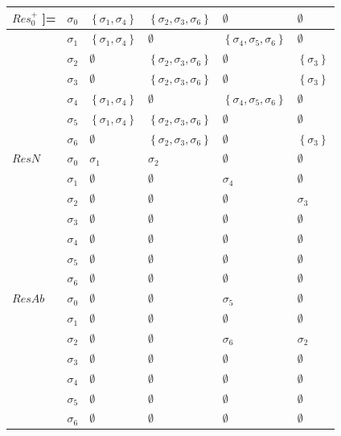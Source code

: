 \documentclass[11pt,a4paper]{article}
\begin{document}
\begin{table}[]
\begin{tabular}{|l|l|l|l|l|l|}
$Res_0^+$
]= & $\sigma_0$ & $\left\{\sigma_1, \sigma_4\right\}$  & $\left\{\sigma_2, \sigma_3,\sigma_6\right\}$ & $\emptyset$ & $\emptyset$   \\ \hline
     & $\sigma_1$ &  $\left\{\sigma_1, \sigma_4\right\}$  & $\emptyset$ & $\left\{\sigma_4, \sigma_5,\sigma_6\right\}$  &  $\emptyset$  \\ \hline
     & $\sigma_2$ &  $\emptyset$  & $\left\{\sigma_2, \sigma_3,\sigma_6\right\}$ & $\emptyset$   &  $\left\{\sigma_3\right\}$ \\ \hline
     & $\sigma_3$ &  $\emptyset$  & $\left\{\sigma_2, \sigma_3,\sigma_6\right\}$ & $\emptyset$   &  $\left\{\sigma_3\right\}$ \\ \hline
     & $\sigma_4$ &  $\left\{\sigma_1, \sigma_4\right\}$  & $\emptyset$ & $\left\{\sigma_4, \sigma_5,\sigma_6\right\}$   &  $\emptyset$  \\ \hline
     & $\sigma_5$ &  $\left\{\sigma_1, \sigma_4\right\}$  & $\left\{\sigma_2, \sigma_3,\sigma_6\right\}$ & $\emptyset$   &  $\emptyset$  \\ \hline
     & $\sigma_6$ &  $\emptyset$  & $\left\{\sigma_2, \sigma_3,\sigma_6\right\}$ & $\emptyset$   &  $\left\{\sigma_3\right\}$  \\ \hline
$ResN$ & $\sigma_0$ &  $\sigma_1$ & $\sigma_2$ & $\emptyset$ & $\emptyset$   \\ \hline
     & $\sigma_1$ &  $\emptyset$  & $\emptyset$ & $\sigma_4$   &  $\emptyset$  \\ \hline
     & $\sigma_2$ &  $\emptyset$  & $\emptyset$ & $\emptyset$   &  $\sigma_3$  \\ \hline
     & $\sigma_3$ &  $\emptyset$  & $\emptyset$ & $\emptyset$   &  $\emptyset$  \\ \hline
     & $\sigma_4$ &  $\emptyset$  & $\emptyset$ & $\emptyset$   &  $\emptyset$  \\ \hline
     & $\sigma_5$ &  $\emptyset$  & $\emptyset$ & $\emptyset$   &  $\emptyset$  \\ \hline
     & $\sigma_6$ &  $\emptyset$  & $\emptyset$ & $\emptyset$   &  $\emptyset$  \\ \hline
 $ResAb$ & $\sigma_0$ &  $\emptyset$ & $\emptyset$ & $\sigma_5$ & $\emptyset$   \\ \hline
     & $\sigma_1$ &  $\emptyset$  & $\emptyset$ & $\emptyset$   &  $\emptyset$  \\ \hline
     & $\sigma_2$ &  $\emptyset$  & $\emptyset$ & $\sigma_6$   &  $\sigma_2$  \\ \hline
     & $\sigma_3$ &  $\emptyset$  & $\emptyset$ & $\emptyset$   &  $\emptyset$  \\ \hline
     & $\sigma_4$ &  $\emptyset$  & $\emptyset$ & $\emptyset$   &  $\emptyset$  \\ \hline
     & $\sigma_5$ &  $\emptyset$  & $\emptyset$ & $\emptyset$   &  $\emptyset$  \\ \hline
     & $\sigma_6$ &  $\emptyset$  & $\emptyset$ & $\emptyset$   &  $\emptyset$  \\ \hline          
\end{tabular}
\end{table}
\end{document}
